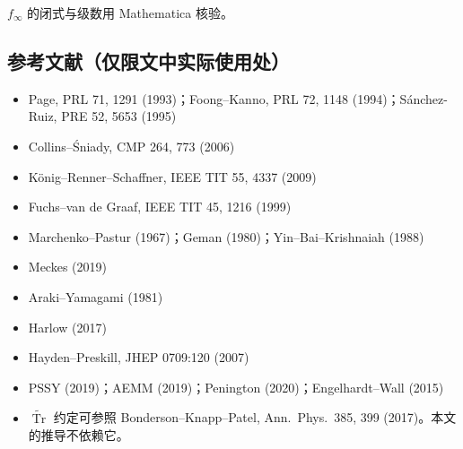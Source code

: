 \documentclass[11pt,a4paper,UTF8]{ctexart}
\newcommand{\tTr}{\widetilde{\operatorname{Tr}}}
\begin{document}
\noindent $f_\infty$ 的闭式与级数用 Mathematica 核验。

\subsection*{参考文献（仅限文中实际使用处）}
\begin{itemize}[nosep]
  \item Page, PRL 71, 1291 (1993)；Foong--Kanno, PRL 72, 1148 (1994)；Sánchez-Ruiz, PRE 52, 5653 (1995)
  \item Collins--Śniady, CMP 264, 773 (2006)
  \item König--Renner--Schaffner, IEEE TIT 55, 4337 (2009)
  \item Fuchs--van de Graaf, IEEE TIT 45, 1216 (1999)
  \item Marchenko--Pastur (1967)；Geman (1980)；Yin--Bai--Krishnaiah (1988)
  \item Meckes (2019)
  \item Araki--Yamagami (1981)
  \item Harlow (2017)
  \item Hayden--Preskill, JHEP 0709:120 (2007)
  \item PSSY (2019)；AEMM (2019)；Penington (2020)；Engelhardt--Wall (2015)
  \item $\tTr$ 约定可参照 Bonderson--Knapp--Patel, Ann.\ Phys.\ 385, 399 (2017)。本文的推导不依赖它。
\end{itemize}
\end{document}
